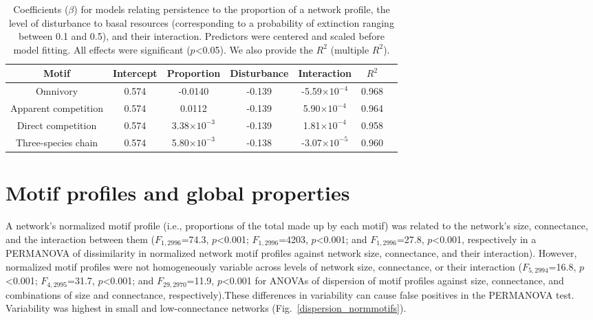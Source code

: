 \documentclass[12pt]{article}
\begin{document}
\begin{spacing}{2.0}
    \begin{table}[h!]
        \caption{Coefficients ($\beta$) for models relating persistence to the proportion of a network profile, the level of disturbance to basal resources (corresponding to a probability of extinction ranging between 0.1 and 0.5), and their interaction. Predictors were centered and scaled before model fitting. All effects were significant ($p$\textless0.05). We also provide the $R^2$ (multiple $R^2$). }
        \label{motif_profile_tab}
        \centering
        \begin{tabular}{c|c c c c c | c}
            Motif & Intercept & Proportion & Disturbance & Interaction & $R^2$\\
            \hline
            Omnivory & 0.574 & -0.0140 & -0.139 & -5.59$\times10^{-4}$ & 0.968 \\
            Apparent competition & 0.574 & 0.0112 & -0.139 & 5.90$\times10^{-4}$ & 0.964 \\
            Direct competition & 0.574 & 3.38$\times10^{-3}$ & -0.139 & 1.81$\times10^{-4}$ & 0.958 \\
            Three-species chain & 0.574 & 5.80$\times10^{-3}$ & -0.138 & -3.07$\times10^{-5}$ & 0.960 \\ 
        \end{tabular}
    \end{table}
\clearpage


\section{Motif profiles and global properties}

    A network's normalized motif profile (i.e., proportions of the total made up by each motif) was related to the network's size, connectance, and the interaction between them ($F_{1,2996}$=74.3, $p$\textless0.001; $F_{1,2996}$=4203, $p$\textless0.001; and $F_{1,2996}$=27.8, $p$\textless0.001, respectively in a PERMANOVA of dissimilarity in normalized network motif profiles against network size, connectance, and their interaction).
    However, normalized motif profiles were not homogeneously variable across levels of network size, connectance, or their interaction  ($F_{5,2994}$=16.8, $p$\textless0.001; $F_{4,2995}$=31.7, $p$\textless0.001; and $F_{29,2970}$=11.9, $p$\textless0.001 for ANOVAs of dispersion of motif profiles against size, connectance, and combinations of size and connectance, respectively).These differences in variability can cause false positives in the PERMANOVA test. Variability was highest in small and low-connectance networks (Fig.~\ref{dispersion_normmotifs}).



\end{spacing}
\end{document}
